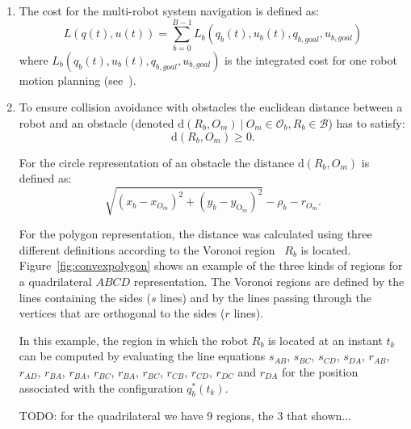 \documentclass[eprint]{actapoly}
\begin{document}
\begin{enumerate}
    \item The cost for the multi-robot system navigation is defined as:
    \begin{equation}
        L(q(t),u(t)) = \sum_{b=0}^{B-1}L_b(q_b(t), u_b(t), q_{b,goal},u_{b,goal})
    \end{equation}
    where $L_b(q_b(t), u_b(t), q_{b,goal},u_{b,goal})$ is the 
    integrated cost for one robot
    motion planning (see~\cite{Defoort2009}).
    
    \item 
    To ensure collision avoidance with obstacles the euclidean 
    distance between
    a robot and an obstacle (denoted $\mathrm{d}(R_b, O_m)\ |\ O_m
    \in \mathcal{O}_b, R_b \in \mathcal{B} $) has to satisfy:
    \begin{equation}
    	\mathrm{d}(R_b, O_m) \geq 0.
    \end{equation}
    
    For the circle representation of an obstacle the distance
    $\mathrm{d}(R_b, O_m)$ is defined as:
    \begin{equation*}
        \sqrt{(x_{b} - x_{O_m})^2 + (y_{b} - y_{\mathrm{O}_m})^2}  - \rho_b - r_{O_m}.
    \end{equation*}
    
    For the polygon representation, the distance was calculated using three different
    definitions according to the Voronoi region~\cite{ericson2004real}
    $R_b$ is located. Figure~\ref{fig:convexpolygon} shows an example of the three kinds
    of regions for a quadrilateral $ABCD$ representation. The Voronoi regions are 
    defined by
    the lines containing the sides ($s$ lines) and by the lines passing
    through the vertices that are orthogonal to the sides ($r$ lines).    
    
	In this example, the region in which the robot $R_b$ is located
	at an instant $t_k$
	can be computed by evaluating the line
 	equations 
 	$s_{AB}$, $s_{BC}$, $s_{CD}$, $s_{DA}$, $r_{AB}$, $r_{AD}$, $r_{BA}$, $r_{BA}$,
 	$r_{BC}$, $r_{BA}$, $r_{BC}$, $r_{CB}$, $r_{CD}$, $r_{DC}$ and $r_{DA}$ for 
 	the position associated with the configuration $q^*_b(t_k)$.
 	

    TODO: for the quadrilateral we have 9 regions, the 3 that shown...
    

\end{enumerate}
\end{document}
